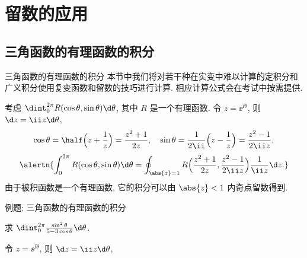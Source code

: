 \section{留数的应用}

\subsection{三角函数的有理函数的积分}

\begin{frame}{三角函数的有理函数的积分}
	\onslide<+->
	本节中我们将对若干种在实变中难以计算的定积分和广义积分使用复变函数和留数的技巧进行计算.
	\onslide<+->
	相应计算公式会在考试中按需提供.

	\onslide<+->
	考虑 $\dint_0^{2\pi} R(\cos\theta,\sin\theta)\d\theta$, 其中 $R$ 是一个有理函数.
	\onslide<+->
	令 $z=\ee^{\ii\theta}$, 则 $\d z=\ii z\d\theta$,
	\onslide<+->
	\[
		\cos\theta=\half\Bigl(z+\frac1z\Bigr)=\frac{z^2+1}{2z},\quad
		\sin\theta=\frac1{2\ii}\Bigl(z-\frac1z\Bigr)=\frac{z^2-1}{2\ii z},
	\]
	\onslide<+->
	\[
		\alertn{\int_0^{2\pi} R(\cos\theta,\sin\theta)\d\theta=\oint_{\abs{z}=1}R\Bigl(\frac{z^2+1}{2z},\frac{z^2-1}{2\ii z}\Bigr)\frac1{\ii z}\d z.}
	\]
	\onslide<+->
	由于被积函数是一个有理函数, 它的积分可以由 $\abs{z}<1$ 内奇点留数得到.
\end{frame}


\begin{frame}{例题: 三角函数的有理函数的积分}\small
	\beqskip{1pt}
	\onslide<+->
	\begin{example}[nearnext]
		求 $\dint_0^{2\pi}\frac{\sin^2\theta}{5-3\cos\theta}\d\theta$.
	\end{example}
	\onslide<+->
	\begin{solution}[nearprev]
		令 $z=\ee^{\ii\theta}$, 则 $\d z=\ii z\d\theta$,
		\onslide<+->{%
			\[
				\cos\theta=\half\Bigl(z+\frac1z\Bigr)=\frac{z^2+1}{2z},\qquad
				\sin\theta=\frac1{2\ii}\Bigl(z-\frac1z\Bigr)=\frac{z^2-1}{2\ii z},
			\]
		}\onslide<+->{%
			\[
				\int_0^{2\pi}\frac{\sin^2\theta}{5-3\cos\theta}\d\theta
				=\oint_{\abs{z}=1}\frac{(z^2-1)^2}{-4z^2}\cdot\frac1{5-3\dfrac{z^2+1}{2z}}\cdot\frac{\d z}{\ii z}
				=-\frac \ii6\oint_{\abs{z}=1}\frac{(z^2-1)^2}{z^2(z-3)(z-\dfrac13)}\d z.
			\]
		}\onslide<+->{%
			则
			$\Res[f(z),0]=\dfrac{10}3, \Res[f(z),\dfrac13]=-\dfrac83$,
		}
		\meddel
	\end{solution}
	\endgroup
\end{frame}

